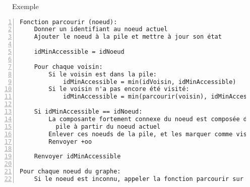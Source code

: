 \documentclass[11pt,a4paper]{article}
\begin{document}
\begin{figure}[h]
  \label{algorithme-tarjan}
  \centering
  \caption{Exemple}
\end{figure}

{
  \color{blue}
  \begin{Verbatim}[numbers=left]
Fonction parcourir (noeud):
    Donner un identifiant au noeud actuel
    Ajouter le noeud à la pile et mettre à jour son état

    idMinAccessible = idNoeud

    Pour chaque voisin:
        Si le voisin est dans la pile:
            idMinAccessible = min(idVoisin, idMinAccessible)
        Si le voisin n'a pas encore été visité:
            idMinAccessible = min(parcourir(voisin), idMinAccessible)

    Si idMinAccessible == idNoeud:
        La composante fortement connexe du noeud est composée des noeuds de la
          pile à partir du noeud actuel
        Enlever ces noeuds de la pile, et les marquer comme visités
        Renvoyer +oo

    Renvoyer idMinAccessible

Pour chaque noeud du graphe:
    Si le noeud est inconnu, appeler la fonction parcourir sur ce noeud
  \end{Verbatim}
}
\end{document}
